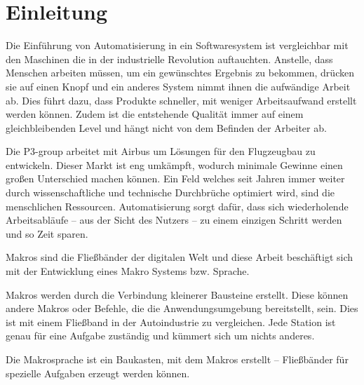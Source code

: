 




\tableofcontents
\newpage

\section{Einleitung}
\label{sec:einleitung}
  Die Einführung von Automatisierung in ein Softwaresystem ist vergleichbar mit den Maschinen die in der industrielle Revolution auftauchten. Anstelle, dass Menschen arbeiten müssen, um ein gewünschtes Ergebnis zu bekommen, drücken sie auf einen Knopf und ein anderes System nimmt ihnen die aufwändige Arbeit ab. Dies führt dazu, dass Produkte schneller, mit weniger Arbeitsaufwand erstellt werden können. Zudem ist die entstehende Qualität immer auf einem gleichbleibenden Level und hängt nicht von dem Befinden der Arbeiter ab.

  Die P3-group arbeitet mit Airbus um Lösungen für den Flugzeugbau zu entwickeln. Dieser Markt ist eng umkämpft, wodurch minimale Gewinne einen großen Unterschied machen können. Ein Feld welches seit Jahren immer weiter durch wissenschaftliche und technische Durchbrüche optimiert wird, sind die menschlichen Ressourcen. Automatisierung sorgt dafür, dass sich wiederholende Arbeitsabläufe -- aus der Sicht des Nutzers -- zu einem einzigen Schritt werden und so Zeit sparen.

  Makros sind die Fließbänder der digitalen Welt und diese Arbeit beschäftigt sich mit der Entwicklung eines Makro Systems bzw. Sprache.

  Makros werden durch die Verbindung kleinerer Bausteine erstellt. Diese können andere Makros oder Befehle, die die Anwendungsumgebung bereitstellt, sein. Dies ist mit einem Fließband in der Autoindustrie zu vergleichen. Jede Station ist genau für eine Aufgabe zuständig und kümmert sich um nichts anderes.

  Die Makrosprache ist ein Baukasten, mit dem Makros erstellt -- Fließbänder für spezielle Aufgaben erzeugt werden können.


